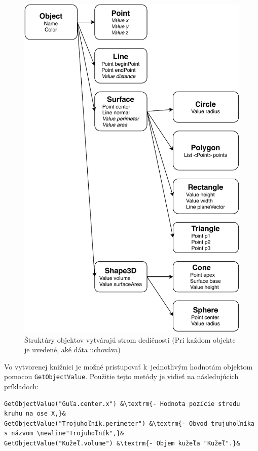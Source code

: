 \begin{figure}[H]
	\centering
	\includegraphics[height=0.95\textheight]{obrazky-figures/Diagram/Draw/Parametric Sctructures Tree.pdf}
	\caption{Štruktúry objektov vytvárajú strom dedičnosti (Pri každom objekte je uvedené, aké dáta uchováva)}
	\label{fig:StromDedicnosti}
\end{figure}
Vo vytvorenej knižnici je možné pristupovať k~jednotlivým hodnotám objektom pomocou 
\texttt{GetObjectValue}. Použitie tejto metódy je vidieť na následujúcich príkladoch:
\begin{lstlisting}
GetObjectValue("Guľa.center.x") &\textrm{- Hodnota pozície stredu kruhu na ose X,}&
GetObjectValue("Trojuhoľník.perimeter") &\textrm{- Obvod trujuhoľníka s názvom \newline"Trojuhoľník",}&
GetObjectValue("Kužeľ.volume") &\textrm{- Objem kužeľa "Kužeľ".}&
\end{lstlisting}


